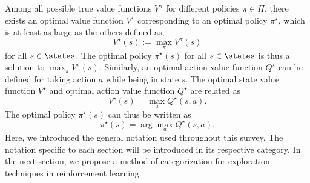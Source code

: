 Among all possible true value functions $V^\pi$ for different policies $\pi\in\Pi$, there exists an optimal value function $V^\star$ corresponding to an optimal policy $\pi^\star$, which is at least as large as the others defined as,
\begin{equation}
    V^\star\left(s\right):=\max_{{\pi}}V^\pi\left(s\right)\label{eq:optimalStateValue1}
\end{equation}
for all $s \in \states$. The optimal policy  $\pi^\star (s)$ for all $s \in \states$ is thus a solution to $\max_{{\pi}}V^\pi\left(s\right)$.
Similarly, an optimal action value function $Q^\star$ can be defined for taking action $a$ while being in state $s$. The optimal state value function $V^\star$ and optimal action value function $Q^\star$ are related as
\begin{equation}
    V^\star\left(s\right)=\max_{{a}}Q^\star\left(s,a\right).\label{eq:optimalStateValue2}
\end{equation}
The optimal policy $\pi^\star\left(s\right)$ can thus be written as
\begin{equation}
    \pi^\star\left(s\right)=\arg\max_{{a}}Q^\star\left(s,a\right).
\end{equation}
Here, we introduced the general notation used throughout this survey. The notation specific to each section will be introduced in its respective category. In the next section, we propose a method of categorization for exploration techniques in reinforcement learning.

